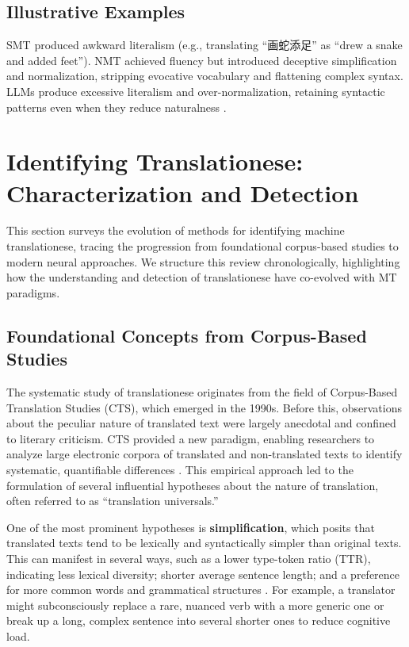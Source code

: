 \documentclass[11pt,a4paper]{article}
\begin{document}
\subsection{Illustrative Examples}

SMT produced awkward literalism (e.g., translating ``画蛇添足'' as ``drew a snake and added feet''). NMT achieved fluency but introduced deceptive simplification and normalization, stripping evocative vocabulary and flattening complex syntax. LLMs produce excessive literalism and over-normalization, retaining syntactic patterns even when they reduce naturalness \cite{wang2024benchmarking,li2025lost}.

\section{Identifying Translationese: Characterization and Detection}

This section surveys the evolution of methods for identifying machine translationese, tracing the progression from foundational corpus-based studies to modern neural approaches. We structure this review chronologically, highlighting how the understanding and detection of translationese have co-evolved with MT paradigms.

\subsection{Foundational Concepts from Corpus-Based Studies}

The systematic study of translationese originates from the field of Corpus-Based Translation Studies (CTS), which emerged in the 1990s. Before this, observations about the peculiar nature of translated text were largely anecdotal and confined to literary criticism. CTS provided a new paradigm, enabling researchers to analyze large electronic corpora of translated and non-translated texts to identify systematic, quantifiable differences \cite{laviosa1998corpus}. This empirical approach led to the formulation of several influential hypotheses about the nature of translation, often referred to as ``translation universals.''

One of the most prominent hypotheses is \textbf{simplification}, which posits that translated texts tend to be lexically and syntactically simpler than original texts. This can manifest in several ways, such as a lower type-token ratio (TTR), indicating less lexical diversity; shorter average sentence length; and a preference for more common words and grammatical structures \cite{baker1993corpus}. For example, a translator might subconsciously replace a rare, nuanced verb with a more generic one or break up a long, complex sentence into several shorter ones to reduce cognitive load.
\end{document}
